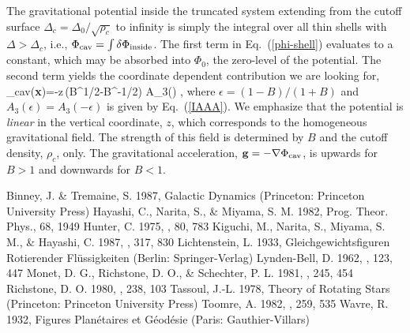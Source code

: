 \begin{appendix}
The gravitational potential inside the truncated system extending from the
cutoff surface $\Delta_c=\Delta_0/\sqrt{\rho_c}$ to infinity is simply the
integral over all thin shells with $\Delta>\Delta_c$, i.e., 
$\Phi_{\rm cav}=\int\delta\Phi_{\rm inside}$. The first term in Eq.\
(\ref{phi-shell}) evaluates to a constant, which may be absorbed into $\Phi_0$, 
the zero-level of the potential. The second term yields the coordinate
dependent contribution we are looking for,
\beq
\Phi_{\rm cav}({\bf x})=-z\,\left(B^{1/2}-B^{-1/2}\right)
A_3(\epsilon)\sqrt{\rho_c} ,
\label{phi-cav}
\eeq
where $\epsilon=(1-B)/(1+B)$ and $A_3(\epsilon)=A_3(-\epsilon)$ is
given by Eq.\ (\ref{IAAA}). We emphasize that the potential is {\em linear} 
in the vertical coordinate, $z$, which corresponds to the homogeneous 
gravitational field. The strength of this field is determined by $B$ and the
cutoff density, $\rho_c$, only. The gravitational acceleration, 
${\bf g}=-\nabla \Phi_{\rm cav}$, is upwards for $B>1$ and downwards for $B<1$.

\end{appendix}


\begin{thebibliography}{DUM}
%
Binney, J. \& Tremaine, S. 1987, Galactic Dynamics
(Princeton: Princeton University Press)
%
Hayashi, C., Narita, S., \& Miyama, S. M. 1982, Prog. Theor. Phys., 68, 1949
%
Hunter, C. 1975, \apj, 80, 783
%
Kiguchi, M., Narita, S., Miyama, S. M., \& Hayashi, C. 1987, \apj, 317, 830
%
Lichtenstein, L. 1933, Gleichgewichtsfiguren Rotierender Fl\"ussigkeiten
(Berlin: Springer-Verlag)
%
Lynden-Bell, D. 1962, \mnras, 123, 447
%
Monet, D. G., Richstone, D. O., \& Schechter, P. L. 1981, \apj, 245, 454
%
Richstone, D. O. 1980, \apj, 238, 103
%
Tassoul, J.-L. 1978, Theory of Rotating Stars 
(Princeton: Princeton University Press)
%
Toomre, A. 1982, \apj, 259, 535
%
Wavre, R. 1932, Figures Plan\'etaires et G\'eod\'esie 
(Paris: Gauthier-Villars)
%
\end{thebibliography}


